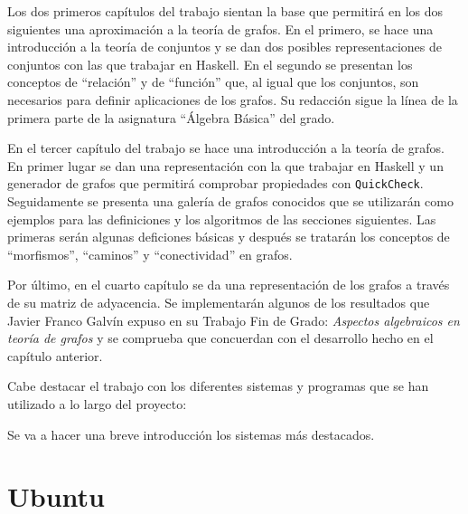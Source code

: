 Los dos primeros capítulos del trabajo sientan la base que permitirá en los
dos siguientes una aproximación a la teoría de grafos. En el primero, se hace
una introducción a la teoría de conjuntos y se dan dos posibles representaciones
de conjuntos con las que trabajar en Haskell. En el segundo se presentan los
conceptos de ``relación'' y de ``función'' que, al igual que los conjuntos, son
necesarios para definir aplicaciones de los grafos. Su redacción sigue la línea 
de la primera parte de la asignatura ``Álgebra Básica'' del grado.

En el tercer capítulo del trabajo se hace una introducción a la teoría de 
grafos. En primer lugar se dan una representación con la que trabajar en Haskell
y un generador de grafos que permitirá comprobar propiedades con 
\texttt{QuickCheck}. Seguidamente se presenta una galería de grafos conocidos
que se utilizarán como ejemplos para las definiciones y los algoritmos de las 
secciones siguientes. Las primeras serán algunas deficiones básicas y después
se tratarán los conceptos de ``morfismos'', ``caminos'' y ``conectividad'' en 
grafos.

Por último, en el cuarto capítulo se da una representación de los grafos a 
través de su matriz de adyacencia. Se implementarán algunos de los resultados
que Javier Franco Galvín expuso en su Trabajo Fin de Grado: 
\textit{Aspectos algebraicos en teoría de grafos} y se comprueba que concuerdan
con el desarrollo hecho en el capítulo anterior.

Cabe destacar el trabajo con los diferentes sistemas y programas que se han 
utilizado a lo largo del proyecto: 

Se va a hacer una breve introducción los sistemas más destacados.

\section*{Ubuntu}
 
